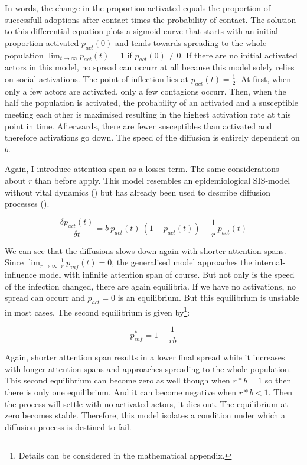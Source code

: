 \documentclass[a4paper,12pt]{article}
\begin{document}
In words, the change in the proportion activated equals the proportion of successfull adoptions after contact times the probability of contact. The solution to this differential equation plots a sigmoid curve that starts with an initial proportion activated $p_{act}(0)$ and tends towards spreading to the whole population $\lim_{t \to \infty} p_{act}(t) = 1$ if $p_{act}(0) \neq 0$. If there are no initial activated actors in this model, no spread can occurr at all because this model solely relies on social activations. The point of inflection lies at $p_{act}(t) = \frac{1}{2}$. At first, when only a few actors are activated, only a few contagions occurr. Then, when the half the population is activated, the probability of an activated and a susceptible meeting each other is maximised resulting in the highest activation rate at this point in time. Afterwards, there are fewer susceptibles than activated and therefore activations go down. The speed of the diffusion is entirely dependent on $b$.

Again, I introduce attention span as a losses term. The same considerations about $r$ than before apply. This model resembles an epidemiological SIS-model without vital dynamics (\cite{hethcoteThreeBasicEpidemiological1989}) but has already been used to describe diffusion processes (\cite{huckfeldtDynamicModelingIntroduction1982}).

\begin{equation}
\frac{\delta p_{act}(t)}{\delta t} = b \ p_{act}(t) \ (1 - p_{act}(t)) - \frac{1}{r} \ p_{act}(t)
\end{equation}
    
We can see that the diffusions slows down again with shorter attention spans. Since $\lim_{r \to \infty} \frac{1}{r} \ p_{inf}(t) = 0$, the generalised model approaches the internal-influence model with infinite attention span of course. But not only is the speed of the infection changed, there are again equilibria. If we have no activations, no spread can occurr and $p_{act} = 0$ is an equilibrium. But this equilibrium is unstable in most cases. The second equilibrium is given by\footnote{Details can be considered in the mathematical appendix.}:

\begin{equation}
p_{inf}^{*} = 1 - \frac{1}{r b}
\end{equation} 

Again, shorter attention span results in a lower final spread while it increases with longer attention spans and approaches spreading to the whole population. This second equilibrium can become zero as well though when $r * b = 1$ so then there is only one equilibrium. And it can become negative when $r * b < 1$. Then the process will settle with no activated actors, it dies out. The equilibrium at zero becomes stable. Therefore, this model isolates a condition under which a diffusion process is destined to fail.
\end{document}
